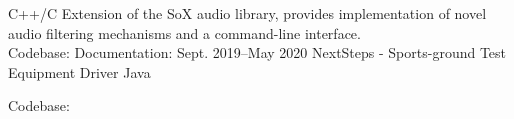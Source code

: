 \documentclass[a4paper]{cv-style}     %
\begin{document}
\begin{minipage}[b]{1.4\textwidth}
\begin{entrylist}
{C++/C}
{
Extension of the SoX audio library, provides implementation of novel audio filtering mechanisms and a command-line interface.\\
Codebase:  Documentation: 
} 
\vspace{0.1cm}
\entry
{Sept. 2019--May 2020}
{NextSteps - Sports-ground Test Equipment Driver}
{Java}
{
Codebase: 


}
\end{entrylist}
  \vspace{0.2cm}
\end{minipage}


\end{document}
